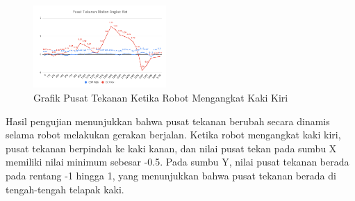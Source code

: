 \begin{enumerate}[label=\Alph*.]
        \begin{figure}[h!]
            \centering
            \includegraphics[width=0.45\textwidth]{gambar/Angkat_Kiri.png}
            \caption{Grafik Pusat Tekanan Ketika Robot Mengangkat Kaki Kiri}
            \label{fig:pusat_tekanan_kiri}
        \end{figure}

        \hspace*{1em} Hasil pengujian menunjukkan bahwa pusat tekanan berubah secara dinamis selama robot melakukan gerakan berjalan. Ketika robot mengangkat kaki kiri, pusat tekanan berpindah ke kaki kanan, dan nilai pusat tekan pada sumbu X memiliki nilai minimum sebesar -0.5. Pada sumbu Y, nilai pusat tekanan berada pada rentang -1 hingga 1, yang menunjukkan bahwa pusat tekanan berada di tengah-tengah telapak kaki.
\end{enumerate}
